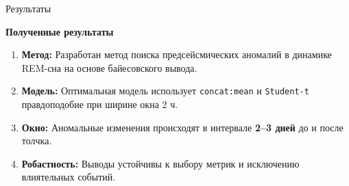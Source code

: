 \documentclass[12pt,aspectratio=169]{beamer}
\begin{document}
	\begin{frame}{Результаты}
		\begin{center}
			\large \textbf{Полученные результаты}
		\end{center}
		
		\vspace{0.3cm}
		\begin{enumerate}
			\item \textbf{Метод:} Разработан метод поиска предсейсмических аномалий в динамике REM-сна на основе байесовского вывода.
			\item \textbf{Модель:} Оптимальная модель использует \texttt{concat:mean} и \texttt{Student-t} правдоподобие при ширине окна 2 ч.
			\item \textbf{Окно:} Аномальные изменения происходят в интервале \textbf{2--3 дней} до и после толчка.
			\item \textbf{Робастность:} Выводы устойчивы к выбору метрик и исключению влиятельных событий.
		\end{enumerate}
	\end{frame}
	
\end{document}
